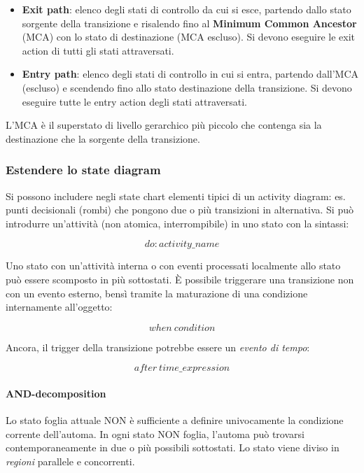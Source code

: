 \begin{itemize}
    \item \textbf{Exit path}: elenco degli stati di controllo da cui si esce, partendo dallo stato sorgente della transizione e risalendo fino al \textbf{Minimum Common Ancestor} (MCA) con lo stato di destinazione (MCA escluso). Si devono eseguire le exit action di tutti gli stati attraversati.
    \item \textbf{Entry path}: elenco degli stati di controllo in cui si entra, partendo dall'MCA (escluso) e scendendo fino allo stato destinazione della transizione. Si devono eseguire tutte le entry action degli stati attraversati.
\end{itemize}

L'MCA è il superstato di livello gerarchico più piccolo che contenga sia la destinazione che la sorgente della transizione.

\subsubsection{Estendere lo state diagram}

Si possono includere negli state chart elementi tipici di un activity diagram: es. punti decisionali (rombi) che pongono due o più transizioni in alternativa. Si può introdurre un'attività (non atomica, interrompibile) in uno stato con la sintassi:

$$do:activity\_name$$

Uno stato con un'attività interna o con eventi processati localmente allo stato può essere scomposto in più sottostati. È possibile triggerare una transizione non con un evento esterno, bensì tramite la maturazione di una condizione internamente all'oggetto:

$$when\ condition$$

Ancora, il trigger della transizione potrebbe essere un \textit{evento di tempo}:

$$after\ time\_expression$$

\paragraph{AND-decomposition} Lo stato foglia attuale NON è sufficiente a definire univocamente la condizione corrente dell'automa. In ogni stato NON foglia, l'automa può trovarsi contemporaneamente in due o più possibili sottostati. Lo stato viene diviso in \textit{regioni} parallele e concorrenti.

